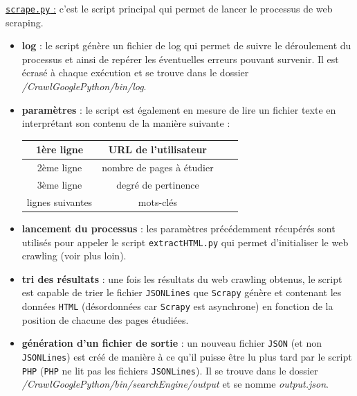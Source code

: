 \documentclass[12pt]{article}
\begin{document}
\newpage
\underline{\texttt{scrape.py} :} c'est le script principal qui permet de lancer le processus de web scraping.
\begin{itemize}
 	\item \textbf{log} : le script génère un fichier de log qui permet de suivre le déroulement du processus et ainsi de repérer les éventuelles erreurs pouvant survenir. Il est écrasé à chaque exécution et se trouve dans le dossier \textit{/CrawlGooglePython/bin/log}.
 	
 	\item \textbf{paramètres} : le script est également en mesure de lire un fichier texte en interprétant son contenu de la manière suivante :
 	
 	\begin{center}
	 \begin{tabular}{|c|c|c|c|}
	\hline
	1ère ligne  & URL de l'utilisateur \\
	\hline
	2ème ligne & nombre de pages à étudier \\
	\hline
	3ème ligne & degré de pertinence \\
	\hline
	lignes suivantes & mots-clés \\
	\hline
	\end{tabular}
	\end{center}
	
	\item \textbf{lancement du processus} : les paramètres précédemment récupérés sont utilisés pour appeler le script \texttt{extractHTML.py} qui permet d'initialiser le web crawling (voir plus loin).
	
	\item \textbf{tri des résultats} : une fois les résultats du web crawling obtenus, le script est capable de trier le fichier \texttt{JSONLines} que \texttt{Scrapy} génère et contenant les données \texttt{HTML} (désordonnées car \texttt{Scrapy} est asynchrone) en fonction de la position de chacune des pages étudiées. 
	
	\item \textbf{génération d'un fichier de sortie} : un nouveau fichier \texttt{JSON} (et non \texttt{JSONLines}) est créé de manière à ce qu'il puisse être lu plus tard par le script \texttt{PHP} (\texttt{PHP} ne lit pas les fichiers \texttt{JSONLines}). Il se trouve dans le dossier \textit{/CrawlGooglePython/bin/searchEngine/output} et se nomme \textit{output.json}.
\end{itemize}
\end{document}
